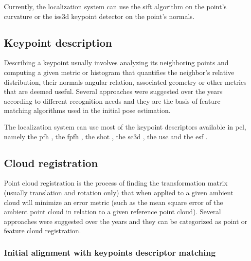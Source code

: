 Currently, the localization system can use the \gls{sift} \cite{Lowe2004} algorithm on the point's curvature or the \gls{iss3d} \cite{Zhong2009} keypoint detector on the point's normals.


\subsection{Keypoint description}

Describing a keypoint usually involves analyzing its neighboring points and computing a given metric or histogram that quantifies the neighbor's relative distribution, their normals angular relation, associated geometry or other metrics that are deemed useful. Several approaches were suggested over the years according to different recognition needs and they are the basis of feature matching algorithms used in the initial pose estimation.

The localization system can use most of the keypoint descriptors available in \gls{pcl}, namely the \gls{pfh} \cite{Rusu2008a}, the \gls{fpfh} \cite{Rusu2009}, the \gls{shot} \cite{Tombari2011}, the \gls{sc3d} \cite{Frome2004}, the \gls{usc} \cite{Tombari2010} and the \gls{esf} \cite{Wohlkinger2011}.


\subsection{Cloud registration}

Point cloud registration is the process of finding the transformation matrix (usually translation and rotation only) that when applied to a given ambient cloud will minimize an error metric (such as the mean square error of the ambient point cloud in relation to a given reference point cloud). Several approaches were suggested over the years and they can be categorized as point or feature cloud registration.


\subsubsection{Initial alignment with keypoints descriptor matching}\label{subsec:localization-system_feature-registration}

